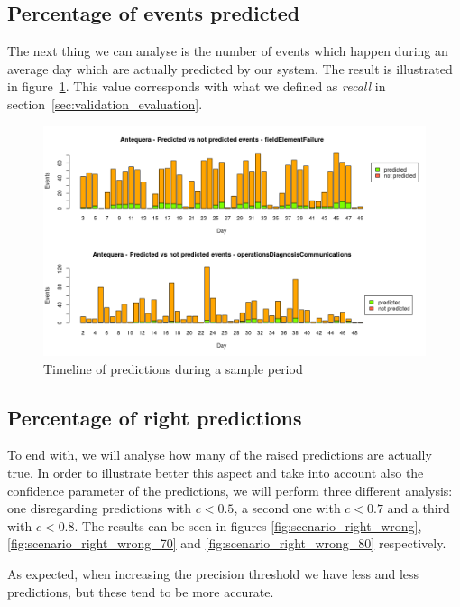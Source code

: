 \subsection{Percentage of events predicted}
The next thing we can analyse is the number of events which happen during an average day which are actually predicted by our system. The result is illustrated in figure~\ref{fig:scenario_pred_notpred}. This value corresponds with what we defined as \emph{recall} in section~\ref{sec:validation_evaluation}.

\begin{figure}[hbtp]
\includegraphics[width=\textwidth]{img/scenario_pred_notpred.png}
\caption{Timeline of predictions during a sample period} \label{fig:scenario_pred_notpred}
\end{figure}

\subsection{Percentage of right predictions}
To end with, we will analyse how many of the raised predictions are actually true. In order to illustrate better this aspect and take into account also the confidence parameter of the predictions, we will perform three different analysis: one disregarding predictions with $c < 0.5$, a second one with $c < 0.7$ and a third with $c < 0.8$. The results can be seen in figures \ref{fig:scenario_right_wrong}, \ref{fig:scenario_right_wrong_70} and \ref{fig:scenario_right_wrong_80} respectively.

As expected, when increasing the precision threshold we have less and less predictions, but these tend to be more accurate.

